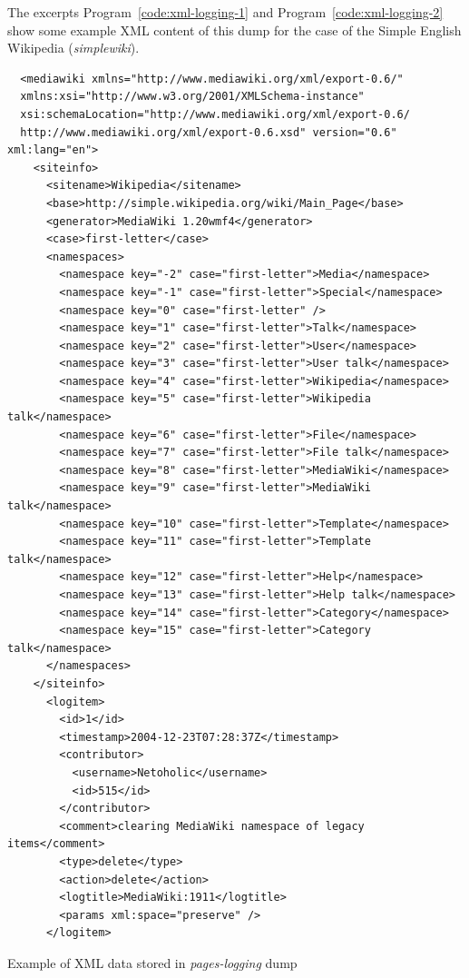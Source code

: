 The excerpts Program~\ref{code:xml-logging-1} and 
Program~\ref{code:xml-logging-2} show some example XML content of
this dump for the case of the Simple English Wikipedia (\textit{simplewiki}).

\begin{program}
  \begin{small}
  \begin{verbatim}
  <mediawiki xmlns="http://www.mediawiki.org/xml/export-0.6/" 
  xmlns:xsi="http://www.w3.org/2001/XMLSchema-instance" 
  xsi:schemaLocation="http://www.mediawiki.org/xml/export-0.6/ 
  http://www.mediawiki.org/xml/export-0.6.xsd" version="0.6" xml:lang="en">
    <siteinfo>
      <sitename>Wikipedia</sitename>
      <base>http://simple.wikipedia.org/wiki/Main_Page</base>
      <generator>MediaWiki 1.20wmf4</generator>
      <case>first-letter</case>
      <namespaces>
        <namespace key="-2" case="first-letter">Media</namespace>
        <namespace key="-1" case="first-letter">Special</namespace>
        <namespace key="0" case="first-letter" />
        <namespace key="1" case="first-letter">Talk</namespace>
        <namespace key="2" case="first-letter">User</namespace>
        <namespace key="3" case="first-letter">User talk</namespace>
        <namespace key="4" case="first-letter">Wikipedia</namespace>
        <namespace key="5" case="first-letter">Wikipedia talk</namespace>
        <namespace key="6" case="first-letter">File</namespace>
        <namespace key="7" case="first-letter">File talk</namespace>
        <namespace key="8" case="first-letter">MediaWiki</namespace>
        <namespace key="9" case="first-letter">MediaWiki talk</namespace>
        <namespace key="10" case="first-letter">Template</namespace>
        <namespace key="11" case="first-letter">Template talk</namespace>
        <namespace key="12" case="first-letter">Help</namespace>
        <namespace key="13" case="first-letter">Help talk</namespace>
        <namespace key="14" case="first-letter">Category</namespace>
        <namespace key="15" case="first-letter">Category talk</namespace>
      </namespaces>
    </siteinfo>
      <logitem>
        <id>1</id>
        <timestamp>2004-12-23T07:28:37Z</timestamp>
        <contributor>
          <username>Netoholic</username>
          <id>515</id>
        </contributor>
        <comment>clearing MediaWiki namespace of legacy items</comment>
        <type>delete</type>
        <action>delete</action>
        <logtitle>MediaWiki:1911</logtitle>
        <params xml:space="preserve" />
      </logitem>
  \end{verbatim}
  \end{small}
  \caption{Example of XML data stored in \textit{pages-logging} dump}
  \label{code:xml-logging-1}
\end{program}


